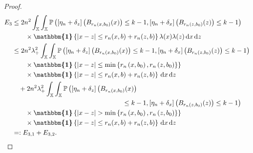 \documentclass[AHL,Unicode,longabstracts]{cedram}
\renewcommand*\P{\mathbb{P}}
\newcommand*\X{\mathbb{X}}
\newcommand*\md{\mathrm{d}}
\newcommand{\ind}{\boldsymbol{\mathbbm{1}}}
\newcommand{\set}[1]{\left\{#1\right\}}
\newcommand{\prob}[1]{\P\left(#1\right)}
\begin{document}
\begin{proof}
\begin{align*}
E_3
&\leq {2} n^2 \int_{\X}\int_{\X} \prob{\left[\eta_n + \delta_z\right]\left(B_{r_n(x,b_0)}(x)\right) \leq k-1, \left[\eta_n + \delta_x\right]\left(B_{r_n(z,b_0)}(z)\right) \leq k-1} \\
& \qquad \times \ind\set{|x-z| \leq r_n(x,b) + r_n(z,b)} \lambda(x)\lambda(z) \, \md x \, \md z \\
& \leq {2} n^2 \lambda_+^2 \int_{\X}\int_{\X} \prob{\left[\eta_n + \delta_z\right]\left(B_{r_n(x,b_0)}(x)\right) \leq k-1, \left[\eta_n + \delta_x\right]\left(B_{r_n(z,b_0)}(z)\right) \leq k-1} \\
& \qquad \times \ind\set{|x-z|\leq \min\left\{r_n\left(x,b_0\right),r_n\left(z,b_0\right)\right\}}\\
&\qquad\times\ind\set{|x-z| \leq r_n(x,b) + r_n(z,b)} \, \md x \, \md z \\
& \quad + {2} n^2 \lambda_+^2 \int_{\X}\int_{\X} \prob{\left[\eta_n + \delta_z\right]\left(B_{r_n(x,b_0)}(x)\right)\right.\\
&\mkern300mu\left.\leq k-1, \left[\eta_n + \delta_x\right]\left(B_{r_n(z,b_0)}(z)\right) \leq k-1} \\
& \qquad\times \ind\set{|x-z|> \min
\left\{r_n\left(x,b_0\right),r_n\left(z,b_0\right)\right\}}\\
&\qquad\times \ind\set{|x-z| \leq r_n(x,b) + r_n(z,b)} \, \md x \, \md z \\
& =: E_{3,1}+E_{3,2}.
\end{align*}


\end{proof}
\end{document}
